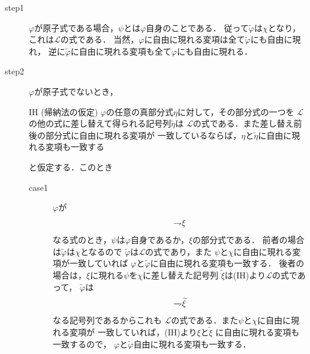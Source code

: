 	\begin{metaprf}\mbox{}
		\begin{description}
			\item[step1] $\varphi$が原子式である場合，$\psi$とは$\varphi$自身のことである．
				従って$\widetilde{\varphi}$は$\chi$となり，これは$\mathcal{L}$の式である．
				当然，$\varphi$に自由に現れる変項は全て$\widetilde{\varphi}$にも自由に現れ，
				逆に$\widetilde{\varphi}$に自由に現れる変項も全て$\varphi$にも自由に現れる．
							
			\item[step2] $\varphi$が原子式でないとき，
				\begin{itembox}[l]{IH (帰納法の仮定)}
					$\varphi$の任意の真部分式$\eta$に対して，その部分式の一つを
					$\mathcal{L}$の他の式に差し替えて得られる記号列$\widetilde{\eta}$は
					$\mathcal{L}$の式である．また差し替え前後の部分式に自由に現れる変項が
					一致しているならば，$\eta$と$\widetilde{\eta}$に自由に現れる変項も一致する
				\end{itembox}
				と仮定する．このとき
				\begin{description}
					\item[case1] $\varphi$が
						\begin{align}
							\rightharpoondown\hspace{-0.25em} \xi
						\end{align}
						なる式のとき，$\psi$は$\varphi$自身であるか，$\xi$の部分式である．
						前者の場合は$\widetilde{\varphi}$は$\chi$となるので
						$\widetilde{\varphi}$は$\mathcal{L}$の式であり，また
						$\psi$と$\chi$に自由に現れる変項が一致していれば
						$\varphi$と$\widetilde{\varphi}$に自由に現れる変項も一致する．
						後者の場合は，$\xi$に現れる$\psi$を$\chi$に差し替えた記号列
						$\widetilde{\xi}$は(IH)より$\mathcal{L}$の式であって，
						$\widetilde{\varphi}$は
						\begin{align}
							\rightharpoondown\hspace{-0.25em} \widetilde{\xi}
						\end{align}
						なる記号列であるからこれも
						$\mathcal{L}$の式である．また$\psi$と$\chi$に自由に現れる変項が
						一致していれば，(IH)より$\xi$と$\widetilde{\xi}$
						に自由に現れる変項も一致するので，
						$\varphi$と$\widetilde{\varphi}$自由に現れる変項も一致する．
					

\end{description}
\end{description}
\end{metaprf}
